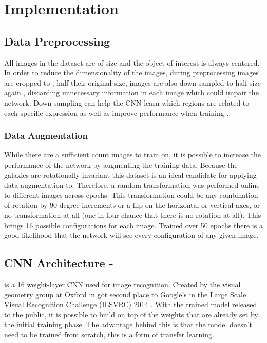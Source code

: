 \section{Implementation}


\subsection{Data Preprocessing}

All images in the dataset are of size  and the object of interest is always centered. In order to reduce the dimensionality of the images, during preprocessing images are cropped to , half their original size, images are also down sampled to half size again , discarding unnecessary information in each image which could impair the network. Down sampling can help the CNN learn which regions are related to each specific expression as well as improve performance when training \cite{deep-learning-review}.

\subsubsection{Data Augmentation}\label{aug}
While there are a sufficient count images to train on, it is possible to increase the performance of the network by augmenting the training data. Because the galaxies are rotationally invariant this dataset is an ideal candidate for applying data augmentation to. Therefore, a random transformation was performed online to different images across epochs. This transformation could be any combination of rotation by 90 degree increments or a flip on the horizontal or vertical axes, or no transformation at all (one in four chance that there is no rotation at all). This brings 16 possible configurations for each image. Trained over 50 epochs there is a good likelihood that the network will see every configuration of any given image.

\subsection{CNN Architecture - \vgg}

\vgg is a 16 weight-layer CNN used for image recognition. Created by the visual geometry group at Oxford in \citeyear{vgg16-arxiv} \vgg got second place to Google's \gnet in the Large Scale Visual Recognition Challenge (ILSVRC) 2014 \cite{vgg16-arxiv}. With the trained model released to the public, it is possible to build on top of the weights that are already set by the initial training phase. The advantage behind this is that the model doesn't need to be trained from scratch, this is a form of transfer learning.


